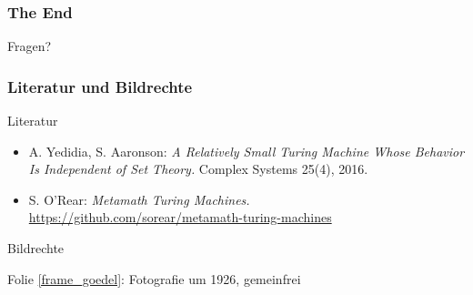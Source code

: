 \documentclass[onlymath]{beamer}
\begin{document}
\begin{frame}\frametitle{The End}

\bigskip
\begin{center}
{\Huge Fragen?}
\end{center}
\bigskip\bigskip


\end{frame}


\begin{frame}[t]\frametitle{Literatur und Bildrechte}

\alert{Literatur}\bigskip

\begin{itemize}
\item A. Yedidia, S. Aaronson: \emph{A Relatively Small Turing Machine Whose Behavior Is Independent of Set Theory.} Complex Systems 25(4), 2016.
\item S. O'Rear: \emph{Metamath Turing Machines.} \url{https://github.com/sorear/metamath-turing-machines}
\end{itemize}

\alert{Bildrechte}\bigskip

Folie \ref{frame_goedel}: Fotografie um 1926, gemeinfrei

\end{frame}
\end{document}
